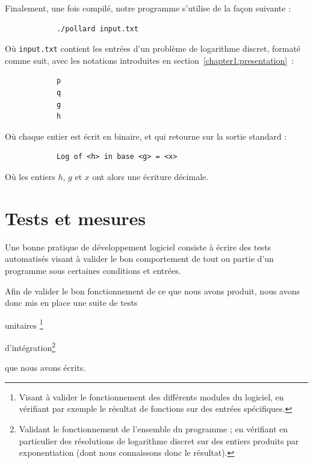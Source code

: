           Finalement, une fois compilé, notre programme s'utilise de la façon suivante :
          \begin{lstlisting}
            ./pollard input.txt
          \end{lstlisting}
          Où \lstinline{input.txt} contient les entrées d'un problème de logarithme discret, formaté comme suit, avec les notations introduites en section~\ref{chapter1:presentation}~:
          \begin{lstlisting}
            p
            q
            g
            h
          \end{lstlisting}
          Où chaque entier est écrit en binaire, et qui retourne sur la sortie standard :
          \begin{lstlisting}
            Log of <h> in base <g> = <x>
          \end{lstlisting}
          Où les entiers $h$, $g$ et $x$ ont alors une écriture décimale.



    \section{Tests et mesures}
      Une bonne pratique de développement logiciel consiste à écrire des tests automatisés visant à valider le bon comportement de tout ou partie d'un programme sous certaines conditions et entrées.

      Afin de valider le bon fonctionnement de ce que nous avons produit, nous avons donc mis en place une suite de tests
      \begin{enumerate*}
        \item unitaires \footnote{Visant à valider le fonctionnement des différents modules du logiciel, en vérifiant par exemple le résultat de fonctions sur des entrées spécifiques.}
        \item d'intégration\footnote{Validant le fonctionnement de l'ensemble du programme ; en vérifiant en particulier des résolutions de logarithme discret sur des entiers produits par exponentiation (dont nous connaissons donc le résultat).}
      \end{enumerate*}
      que nous avons écrits.

